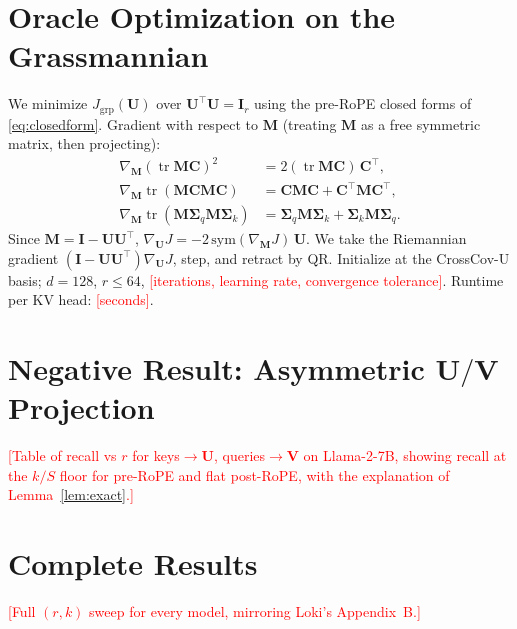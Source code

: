 \documentclass[10pt]{article}
\newcommand{\TODO}[1]{\textcolor{red}{[#1]}}
\newcommand{\tr}{\operatorname{tr}}
\newcommand{\bV}{\mathbf{V}}
\newcommand{\bU}{\mathbf{U}}
\newcommand{\bC}{\mathbf{C}}
\newcommand{\bM}{\mathbf{M}}
\newcommand{\bI}{\mathbf{I}}
\newcommand{\Sq}{\bm{\Sigma}_q}
\newcommand{\Sk}{\bm{\Sigma}_k}
\newcommand{\method}{CrossCov-U}
\theoremstyle{plain}
\theoremstyle{definition}
\theoremstyle{remark}
\begin{document}
\section{Oracle Optimization on the Grassmannian}
\label{app:oracle}
We minimize $J_{\mathrm{grp}}(\bU)$ over $\bU^\top\bU=\bI_r$ using the
pre-RoPE closed forms of \eqref{eq:closedform}. Gradient with respect to $\bM$
(treating $\bM$ as a free symmetric matrix, then projecting):
\begin{align}
\nabla_{\bM}(\tr\bM\bC)^2 &= 2(\tr\bM\bC)\,\bC^\top,\\
\nabla_{\bM}\tr(\bM\bC\bM\bC) &= \bC\bM\bC+\bC^\top\bM\bC^\top,\\
\nabla_{\bM}\tr(\bM\Sq\bM\Sk) &= \Sq\bM\Sk+\Sk\bM\Sq .
\end{align}
Since $\bM=\bI-\bU\bU^\top$, $\nabla_{\bU}J=-2\,\mathrm{sym}(\nabla_{\bM}J)\,\bU$.
We take the Riemannian gradient $(\bI-\bU\bU^\top)\nabla_{\bU}J$, step, and
retract by QR. Initialize at the \method{} basis; $d=128$, $r\le64$,
\TODO{iterations, learning rate, convergence tolerance}. Runtime per KV head:
\TODO{seconds}.

\section{Negative Result: Asymmetric $\bU/\bV$ Projection}
\label{app:asym}
\TODO{Table of recall vs $r$ for keys$\to\bU$, queries$\to\bV$ on Llama-2-7B,
showing recall at the $k/S$ floor for pre-RoPE and flat post-RoPE, with the
explanation of Lemma~\ref{lem:exact}.}

\section{Complete Results}
\label{app:full}
\TODO{Full $(r,k)$ sweep for every model, mirroring Loki's Appendix~B.}
\end{document}
